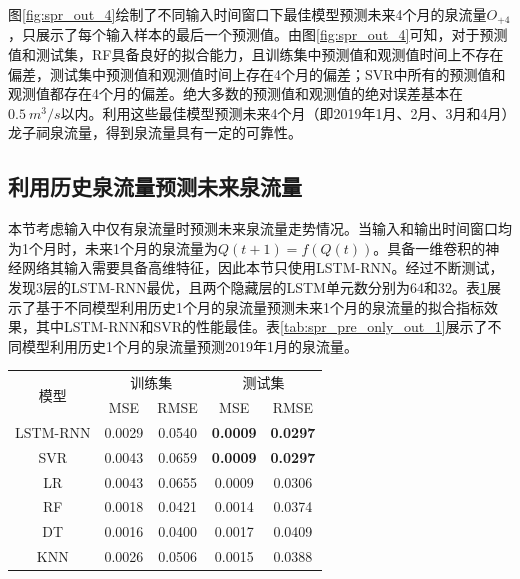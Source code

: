 图\ref{fig:spr_out_4}绘制了不同输入时间窗口下最佳模型预测未来4个月的泉流量$O_{+4}$，只展示了每个输入样本的最后一个预测值。由图\ref{fig:spr_out_4}可知，对于预测值和测试集，RF具备良好的拟合能力，且训练集中预测值和观测值时间上不存在偏差，测试集中预测值和观测值时间上存在4个月的偏差；SVR中所有的预测值和观测值都存在4个月的偏差。绝大多数的预测值和观测值的绝对误差基本在$\SI{0.5}{m^{3}/s}$以内。利用这些最佳模型预测未来4个月（即2019年1月、2月、3月和4月）龙子祠泉流量，得到泉流量具有一定的可靠性。

\subsection{利用历史泉流量预测未来泉流量}\label{sec:spr_only}

本节考虑输入中仅有泉流量时预测未来泉流量走势情况。当输入和输出时间窗口均为1个月时，未来1个月的泉流量为$Q(t+1)=f(Q(t))$。具备一维卷积的神经网络其输入需要具备高维特征，因此本节只使用LSTM-RNN。经过不断测试，发现3层的LSTM-RNN最优，且两个隐藏层的LSTM单元数分别为64和32。表\ref{tab:spr_indicators_only_out_1}展示了基于不同模型利用历史1个月的泉流量预测未来1个月的泉流量的拟合指标效果，其中LSTM-RNN和SVR的性能最佳。表\ref{tab:spr_pre_only_out_1}展示了不同模型利用历史1个月的泉流量预测2019年1月的泉流量。

\begin{table}[!htbp]
  \centering
  \label{tab:spr_indicators_only_out_1}
  \footnotesize
  \renewcommand{\arraystretch}{1}
  \begin{tabular}{ccccc}
    \toprule
    \multirow{2}{*}{模型} & \multicolumn{2}{c}{训练集} & \multicolumn{2}{c}{测试集}\\
    \cmidrule(lr){2-3} \cmidrule(lr){4-5}
    \noalign{\smallskip}
    & MSE & RMSE & MSE & RMSE \\
    \midrule 
    LSTM-RNN & 0.0029 & 0.0540 & \textbf{0.0009} & \textbf{0.0297} \\
    SVR & 0.0043 & 0.0659 & \textbf{0.0009} & \textbf{0.0297} \\
    LR & 0.0043 & 0.0655 & 0.0009 & 0.0306 \\
    RF & 0.0018 & 0.0421 & 0.0014 & 0.0374 \\
    DT & 0.0016 & 0.0400 & 0.0017 & 0.0409 \\
    KNN & 0.0026 & 0.0506 & 0.0015 & 0.0388 \\
    \bottomrule
  \end{tabular}
\end{table}

